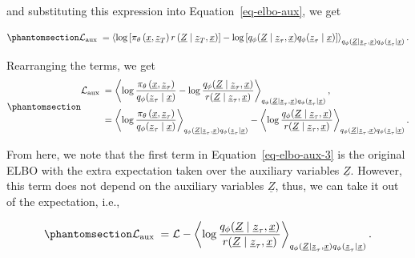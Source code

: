 \documentclass[
]{scrartcl}
\begin{document}
\begin{refsection}
and substituting this expression into Equation~\ref{eq-elbo-aux}, we get

\begin{equation}\phantomsection\label{eq-elbo-aux-2}{
\mathcal{L}_{\text {aux }} =
\left\langle\log 
    \left[
        \pi_\theta\left(\underline{x}, \underline{z}_T\right) 
        r\left(\underline{Z} \mid \underline{z}_T, \underline{x}\right)
    \right] - 
    \log \left[q_\phi(\underline{Z} \mid \underline{z}_\tau, \underline{x}) q_\phi(\underline{z}_\tau \mid \underline{x})\right]
\right\rangle_{q_\phi(\underline{Z} \mid \underline{z}_\tau, \underline{x}) q_\phi(\underline{z}_\tau \mid \underline{x})}.
}\end{equation}

Rearranging the terms, we get
\begin{equation}\phantomsection\label{eq-elbo-aux-3}{
\begin{aligned}
\mathcal{L}_{\text {aux }} 
& = \left\langle 
    \log \frac{\pi_\theta\left(\underline{x}, \underline{z}_\tau\right)}{q_\phi(\underline{z}_\tau \mid \underline{x})} - 
    \log \frac{q_\phi(\underline{Z} \mid \underline{z}_\tau, \underline{x})}{r(\underline{Z} \mid \underline{z}_\tau, \underline{x})}
\right\rangle_{
    q_\phi(\underline{Z} \mid \underline{z}_\tau, \underline{x})
    q_\phi(\underline{z}_\tau \mid \underline{x})
}, \\
& = \left\langle 
    \log \frac{\pi_\theta\left(\underline{x}, \underline{z}_\tau\right)}{q_\phi(\underline{z}_\tau \mid \underline{x})}
\right\rangle_{
    q_\phi(\underline{Z} \mid \underline{z}_\tau, \underline{x})
    q_\phi(\underline{z}_\tau \mid \underline{x})
} - 
\left\langle
    \log \frac{q_\phi(\underline{Z} \mid \underline{z}_\tau, \underline{x})}{r(\underline{Z} \mid \underline{z}_\tau, \underline{x})}
\right\rangle_{
    q_\phi(\underline{Z} \mid \underline{z}_\tau, \underline{x})
    q_\phi(\underline{z}_\tau \mid \underline{x})
}.
\end{aligned}
}\end{equation}

From here, we note that the first term in Equation~\ref{eq-elbo-aux-3}
is the original ELBO with the extra expectation taken over the auxiliary
variables \(\underline{Z}\). However, this term does not depend on the
auxiliary variables \(\underline{Z}\), thus, we can take it out of the
expectation, i.e.,

\begin{equation}\phantomsection\label{eq-elbo-aux-4}{
\mathcal{L}_{\text {aux }} = \mathcal{L} - 
\left\langle 
    \log \frac{q_\phi(\underline{Z} \mid \underline{z}_\tau, \underline{x})}{r(\underline{Z} \mid \underline{z}_\tau, \underline{x})}
\right\rangle_{
    q_\phi(\underline{Z} \mid \underline{z}_\tau, \underline{x})
    q_\phi(\underline{z}_\tau \mid \underline{x})
}.
}\end{equation}


\end{refsection}
\end{document}
